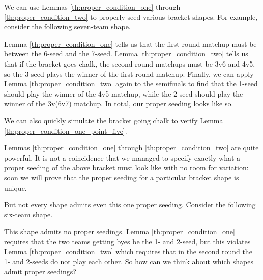 {    We can use Lemmas \ref{th:proper_condition_one} through \ref{th:proper_condition_two} to properly seed various bracket shapes. For example, consider the following seven-team shape.


    Lemma \ref{th:proper_condition_one} tells us that the first-round matchup must be between the 6-seed and the 7-seed. Lemma \ref{th:proper_condition_two} tells us that if the bracket goes chalk, the second-round matchups must be 3v6 and 4v5, so the 3-seed plays the winner of the first-round matchup. Finally, we can apply Lemma \ref{th:proper_condition_two} again to the semifinals to find that the 1-seed should play the winner of the 4v5 matchup, while the 2-seed should play the winner of the 3v(6v7) matchup. In total, our proper seeding looks like so.


    We can also quickly simulate the bracket going chalk to verify Lemma \ref{th:proper_condition_one_point_five}.

    Lemmas \ref{th:proper_condition_one} through \ref{th:proper_condition_two} are quite powerful. It is not a coincidence that we managed to specify exactly what a proper seeding of the above bracket must look like with no room for variation: soon we will prove that the proper seeding for a particular bracket shape is unique. 

    But not every shape admits even this one proper seeding. Consider the following six-team shape.


    This shape admits no proper seedings. Lemma \ref{th:proper_condition_one} requires that the two teams getting byes be the 1- and 2-seed, but this violates Lemma \ref{th:proper_condition_two} which requires that in the second round the 1- and 2-seeds do not play each other. So how can we think about which shapes admit proper seedings?

    }
